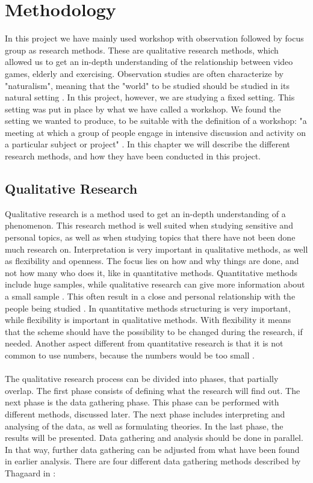 \chapter{Methodology}
In this project we have mainly used workshop with observation followed by focus group as research methods. These are qualitative research methods, which allowed us to get an in-depth understanding of the relationship between video games, elderly and exercising. Observation studies are often characterize by "naturalism", meaning that the "world" to be studied should be studied in its natural setting \cite{tjora}. In this project, however, we are studying a fixed setting. This setting was put in place by what we have called a workshop. We found the setting we wanted to produce, to be suitable with the definition of a workshop: "a meeting at which a group of people engage in intensive discussion and activity on a particular subject or project" \cite{dictionary}. In this chapter we will describe the different research methods, and how they have been conducted in this project. 

\section{Qualitative Research}
Qualitative research is a method used to get an in-depth understanding of a phenomenon. This research method is well suited when studying sensitive and personal topics, as well as when studying topics that there have not been done much research on. Interpretation is very important in qualitative methods, as well as flexibility and openness. The focus lies on how and why things are done, and not how many who does it, like in quantitative methods. Quantitative methods include huge samples, while qualitative research can give more information about a small sample \cite{qualitative}. This often result in a close and personal relationship with the people being studied \cite{tjora}. In quantitative methods structuring is very important, while flexibility is important in qualitative methods. With flexibility it means that the scheme should have the possibility to be changed during the research, if needed. Another aspect different from quantitative research is that it is not common to use numbers, because the numbers would be too small \cite{qualitative}. \\ \\
The qualitative research process can be divided into phases, that partially overlap. The first phase consists of defining what the research will find out. The next phase is the data gathering phase. This phase can be performed with different methods, discussed later. The next phase includes interpreting and analysing of the data, as well as formulating theories. In the last phase, the results will be presented. Data gathering and analysis should be done in parallel. In that way, further data gathering can be adjusted from what have been found in earlier analysis. There are four different data gathering methods described by Thagaard in \cite{qualitative}:

